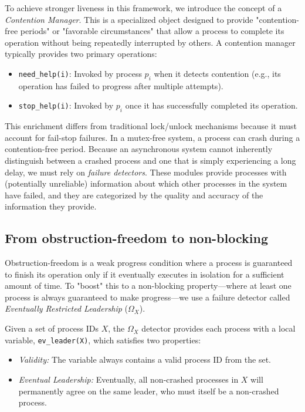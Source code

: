 To achieve stronger liveness in this framework, we introduce the concept of a \textit{Contention Manager}. This is a specialized object designed to provide "contention-free periods" or "favorable circumstances" that allow a process to complete its operation without being repeatedly interrupted by others. A contention manager typically provides two primary operations:
\begin{itemize}
    \item \texttt{need\_help(i)}: Invoked by process $p_i$ when it detects contention (e.g., its operation has failed to progress after multiple attempts).
    \item \texttt{stop\_help(i)}: Invoked by $p_i$ once it has successfully completed its operation.
\end{itemize}

This enrichment differs from traditional lock/unlock mechanisms because it must account for fail-stop failures. In a mutex-free system, a process can crash during a contention-free period. Because an asynchronous system cannot inherently distinguish between a crashed process and one that is simply experiencing a long delay, we must rely on \textit{failure detectors}. These modules provide processes with (potentially unreliable) information about which other processes in the system have failed, and they are categorized by the quality and accuracy of the information they provide.

\subsection{From obstruction-freedom to non-blocking}
Obstruction-freedom is a weak progress condition where a process is guaranteed to finish its operation only if it eventually executes in isolation for a sufficient amount of time. To "boost" this to a non-blocking property—where at least one process is always guaranteed to make progress—we use a failure detector called \textit{Eventually Restricted Leadership} ($\Omega_X$).

Given a set of process IDs $X$, the $\Omega_X$ detector provides each process with a local variable, \texttt{ev\_leader(X)}, which satisfies two properties:
\begin{itemize}
    \item \textit{Validity:} The variable always contains a valid process ID from the set.
    \item \textit{Eventual Leadership:} Eventually, all non-crashed processes in $X$ will permanently agree on the same leader, who must itself be a non-crashed process.
\end{itemize}
    
